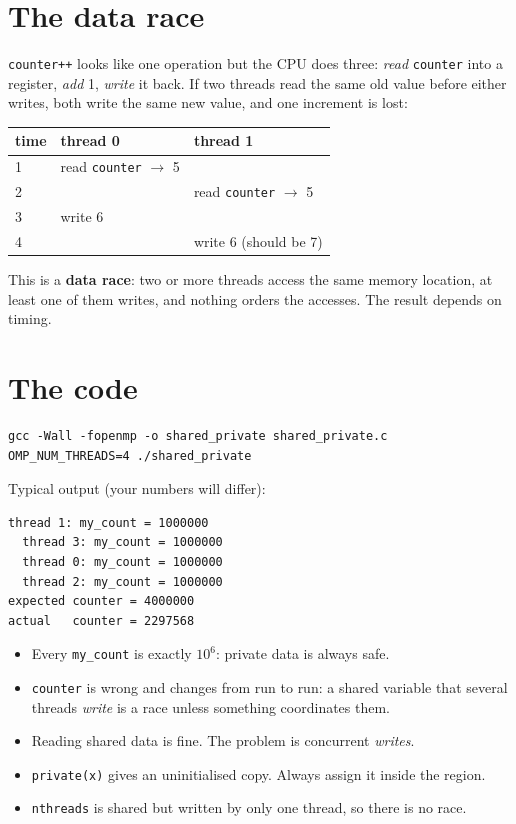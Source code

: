 \documentclass[11pt,a4paper]{article}
\begin{document}
\section{The data race}
\texttt{counter++} looks like one operation but the CPU does three: \emph{read}
\texttt{counter} into a register, \emph{add} 1, \emph{write} it back. If two threads read
the same old value before either writes, both write the same new value, and one increment
is lost:
\begin{center}
\begin{tabular}{@{}lll@{}}
\toprule
time & thread 0 & thread 1 \\ \midrule
1 & read \texttt{counter} $\to$ 5 & \\
2 & & read \texttt{counter} $\to$ 5 \\
3 & write 6 & \\
4 & & write 6 \quad (should be 7) \\
\bottomrule
\end{tabular}
\end{center}
This is a \textbf{data race}: two or more threads access the same memory location, at
least one of them writes, and nothing orders the accesses. The result depends on timing.

\section{The code}


\begin{lstlisting}[style=sh]
gcc -Wall -fopenmp -o shared_private shared_private.c
OMP_NUM_THREADS=4 ./shared_private
\end{lstlisting}
Typical output (your numbers will differ):
\begin{lstlisting}[style=sh]
  thread 1: my_count = 1000000
  thread 3: my_count = 1000000
  thread 0: my_count = 1000000
  thread 2: my_count = 1000000
expected counter = 4000000
actual   counter = 2297568
\end{lstlisting}

\begin{keyidea}
\begin{itemize}
  \item Every \texttt{my\_count} is exactly $10^6$: private data is always safe.
  \item \texttt{counter} is wrong and changes from run to run: a shared variable that
        several threads \emph{write} is a race unless something coordinates them.
  \item Reading shared data is fine. The problem is concurrent \emph{writes}.
  \item \texttt{private(x)} gives an uninitialised copy. Always assign it inside the region.
  \item \texttt{nthreads} is shared but written by only one thread, so there is no race.
\end{itemize}
\end{keyidea}
\end{document}
